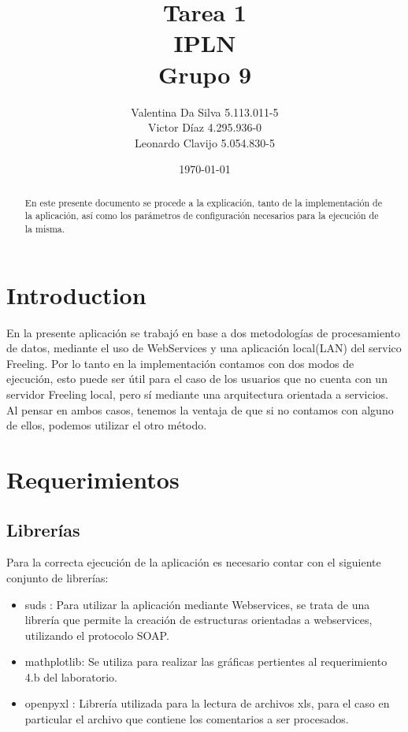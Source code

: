 \documentclass[12pt]{article}
\title{Tarea 1 \\ IPLN \\ Grupo 9}
\author{
  Valentina Da Silva 5.113.011-5\\
  Victor Díaz 4.295.936-0\\
  Leonardo Clavijo 5.054.830-5
}
\date{\today}
\begin{document}
\maketitle

\begin{abstract}
En este presente documento se procede a la explicación, tanto de la implementación de la aplicación, así como los parámetros de configuración necesarios para la ejecución de la misma.
\end{abstract}

\newpage
\tableofcontents
\newpage

\section{Introduction}
En la presente aplicación se trabajó en base a dos metodologías de procesamiento de datos, mediante el uso de WebServices y una aplicación local(LAN) del servico Freeling.
Por lo tanto en la implementación contamos con dos modos de ejecución, esto puede ser útil para el caso de los usuarios que no cuenta con un servidor Freeling local, pero sí mediante una arquitectura orientada a servicios.
Al pensar en ambos casos, tenemos la ventaja de que si no contamos con alguno de ellos, podemos utilizar el otro método.

\section{Requerimientos}

\subsection{Librerías}\label{lib}
Para la correcta ejecución de la aplicación es necesario contar con el siguiente conjunto de librerías:
\begin{itemize}
  \item suds :  Para utilizar la aplicación mediante Webservices, se trata de una librería que permite la creación de estructuras orientadas a webservices, utilizando el protocolo SOAP.
  \item mathplotlib: Se utiliza para realizar las gráficas pertientes al requerimiento 4.b del laboratorio.
  \item openpyxl : Librería utilizada para la lectura de archivos xls, para el caso en particular el archivo que contiene los comentarios a ser procesados.
\end{itemize}
\end{document}
